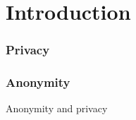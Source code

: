 \section{Introduction}

\begin{frame}
	\frametitle {Privacy}


\end{frame}

\begin{frame}
	\frametitle {Anonymity}


	\begin{block}{Anonymity and privacy}
	\end{block}

\end{frame}
